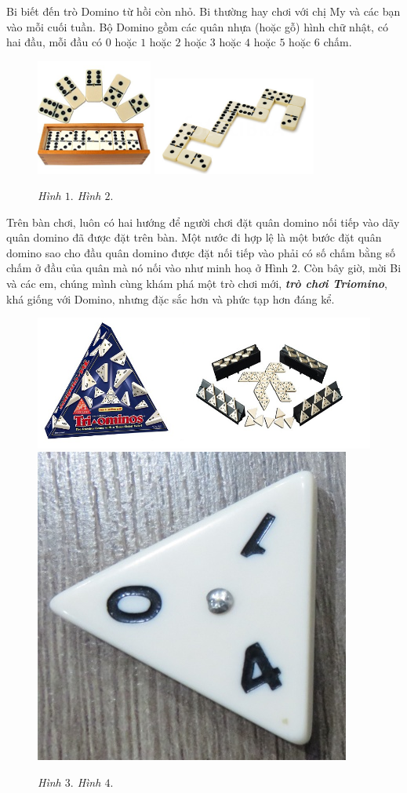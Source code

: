 	Bi biết đến trò Domino từ hồi còn nhỏ. Bi thường hay chơi với chị My và các bạn vào mỗi cuối tuần.
	Bộ Domino gồm các quân nhựa (hoặc gỗ) hình chữ nhật, có hai đầu, mỗi đầu có $0$ hoặc $1$ hoặc $2$ hoặc $3$ hoặc $4$ hoặc $5$ hoặc $6$ chấm.
	\begin{figure}[H]
	\centering
	\vspace*{-10pt}
	\captionsetup{labelformat=empty, justification=centering}
	\includegraphics[width=0.34\textwidth]{dom-01}
	\includegraphics[width=0.48\textwidth]{dom-02}
	\caption{\textit{\small Hình $1.$ \hspace{110pt}Hình $2.$}}
	\vspace*{-15pt}
	\end{figure}
	Trên bàn chơi, luôn có hai hướng để người chơi đặt quân domino nối tiếp vào dãy quân domino đã được đặt trên bàn. Một nước đi hợp lệ là một bước đặt quân domino sao cho đầu quân domino được đặt nối tiếp vào phải có số chấm bằng số chấm ở đầu của quân mà nó nối vào như minh hoạ ở Hình $2$.
	\vskip 0.1cm
	Còn bây giờ, mời Bi và các em, chúng mình cùng khám phá một trò chơi mới, \textit{\textbf{\color{toancuabi}trò chơi Triomino}}, khá giống với Domino, nhưng đặc sắc hơn và phức tạp hơn đáng kể.
	\begin{figure}[H]
		\centering
		\vspace*{-5pt}
		\captionsetup{labelformat=empty, justification=centering}
		\includegraphics[height=0.25\textwidth]{dom-07}
		\includegraphics[height=0.25\textwidth]{dom-08}
		\caption{\textit{\small Hình $3.$ \hspace{90pt}Hình $4.$}}
		\vspace*{-5pt}
	\end{figure}
